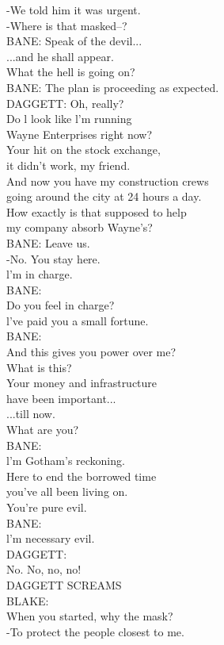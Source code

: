 \documentclass{article}
\begin{document}
\begin{multicols}{3}
-We told him it was urgent.\\
-Where is that masked--?\\
BANE: Speak of the devil...\\
...and he shall appear.\\
What the hell is going on?\\
BANE: The plan is proceeding as expected.\\
DAGGETT: Oh, really?\\
Do l look like l'm running\\
Wayne Enterprises right now?\\
Your hit on the stock exchange,\\
it didn't work, my friend.\\
And now you have my construction crews\\
going around the city at 24 hours a day.\\
How exactly is that supposed to help\\
my company absorb Wayne's?\\
BANE: Leave us.\\
-No. You stay here.\\
l'm in charge.\\
BANE:\\
Do you feel in charge?\\
l've paid you a small fortune.\\
BANE:\\
And this gives you power over me?\\
What is this?\\
Your money and infrastructure\\
have been important...\\
...till now.\\
What are you?\\
BANE:\\
l'm Gotham's reckoning.\\
Here to end the borrowed time\\
you've all been living on.\\
You're pure evil.\\
BANE:\\
l'm necessary evil.\\
DAGGETT:\\
No. No, no, no!\\
DAGGETT SCREAMS\\
BLAKE:\\
When you started, why the mask?\\
-To protect the people closest to me.\\

\end{multicols}
\end{document}

